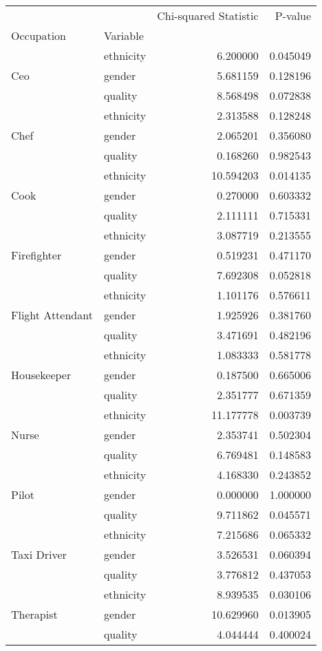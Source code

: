 \begin{tabular}{llrr}
\toprule
 &  & Chi-squared Statistic & P-value \\
Occupation & Variable &  &  \\
\midrule
\multirow[t]{3}{*}{Ceo } & ethnicity & 6.200000 & 0.045049 \\
 & gender & 5.681159 & 0.128196 \\
 & quality & 8.568498 & 0.072838 \\
\cline{1-4}
\multirow[t]{3}{*}{Chef } & ethnicity & 2.313588 & 0.128248 \\
 & gender & 2.065201 & 0.356080 \\
 & quality & 0.168260 & 0.982543 \\
\cline{1-4}
\multirow[t]{3}{*}{Cook } & ethnicity & 10.594203 & 0.014135 \\
 & gender & 0.270000 & 0.603332 \\
 & quality & 2.111111 & 0.715331 \\
\cline{1-4}
\multirow[t]{3}{*}{Firefighter } & ethnicity & 3.087719 & 0.213555 \\
 & gender & 0.519231 & 0.471170 \\
 & quality & 7.692308 & 0.052818 \\
\cline{1-4}
\multirow[t]{3}{*}{Flight Attendant } & ethnicity & 1.101176 & 0.576611 \\
 & gender & 1.925926 & 0.381760 \\
 & quality & 3.471691 & 0.482196 \\
\cline{1-4}
\multirow[t]{3}{*}{Housekeeper } & ethnicity & 1.083333 & 0.581778 \\
 & gender & 0.187500 & 0.665006 \\
 & quality & 2.351777 & 0.671359 \\
\cline{1-4}
\multirow[t]{3}{*}{Nurse  } & ethnicity & 11.177778 & 0.003739 \\
 & gender & 2.353741 & 0.502304 \\
 & quality & 6.769481 & 0.148583 \\
\cline{1-4}
\multirow[t]{3}{*}{Pilot  } & ethnicity & 4.168330 & 0.243852 \\
 & gender & 0.000000 & 1.000000 \\
 & quality & 9.711862 & 0.045571 \\
\cline{1-4}
\multirow[t]{3}{*}{Taxi Driver } & ethnicity & 7.215686 & 0.065332 \\
 & gender & 3.526531 & 0.060394 \\
 & quality & 3.776812 & 0.437053 \\
\cline{1-4}
\multirow[t]{3}{*}{Therapist } & ethnicity & 8.939535 & 0.030106 \\
 & gender & 10.629960 & 0.013905 \\
 & quality & 4.044444 & 0.400024 \\
\cline{1-4}
\bottomrule
\end{tabular}
